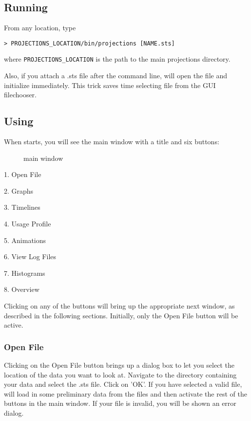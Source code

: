 \documentclass[10pt,dvips]{article}
\begin{document}
\subsection{Running \projections{}}
From any location, type

{\tt > PROJECTIONS\_LOCATION/bin/projections [NAME.sts]}

where {\tt PROJECTIONS\_LOCATION} is the path to the main projections
directory.

Also, if you attach a .sts file after the command line, \projections{} will
open the file and initialize immediately. This trick saves time selecting file
from the GUI filechooser.

\subsection{Using \projections{}}
When \projections{} starts, you will see the main window with a title and
six buttons:

\begin{figure}[htb]
\center
{}
\caption{\projections{} main window}
\label{mainwindow}
\end{figure}

1. Open File

2. Graphs

3. Timelines

4. Usage Profile

5. Animations

6. View Log Files

7. Histograms

8. Overview

Clicking on any of the buttons will bring up the appropriate next window, as
described in the following sections.  Initially, only the Open File button
will be active.

\subsubsection{Open File}

   Clicking on the Open File button brings up a dialog box to let you select
   the location of the data you want to look at.  Navigate to the directory
   containing your data and select the .sts file.  Click on 'OK'.  If you
   have selected a valid file, \projections{} will load in some preliminary data
   from the files and then activate the rest of the buttons in the main window.
   If your file is invalid, you will be shown an error dialog.
\end{document}
